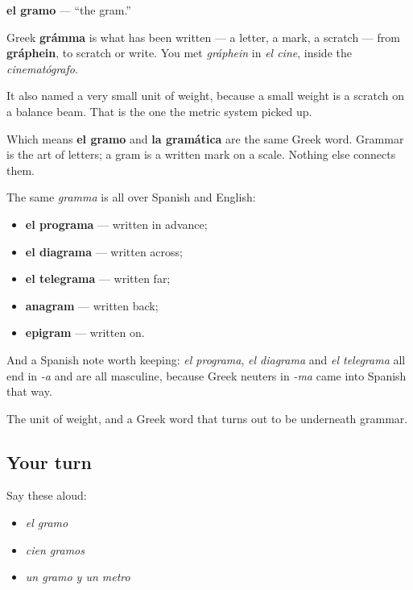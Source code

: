 \begin{cousinweb}
\textbf{el gramo} — \textquotedblleft{}the gram.\textquotedblright{}

Greek \textbf{grámma} is what has been written — a letter, a mark, a scratch — from \textbf{gráphein}, to scratch or write. You met \emph{gráphein} in \emph{el cine}, inside the \emph{cinematógrafo}.

It also named a very small unit of weight, because a small weight is a scratch on a balance beam. That is the one the metric system picked up.

Which means \textbf{el gramo} and \textbf{la gramática} are the same Greek word. Grammar is the art of letters; a gram is a written mark on a scale. Nothing else connects them.

The same \emph{gramma} is all over Spanish and English:

\begin{itemize}
\raggedright
  \item \textbf{el programa} — written in advance;
  \item \textbf{el diagrama} — written across;
  \item \textbf{el telegrama} — written far;
  \item \textbf{anagram} — written back;
  \item \textbf{epigram} — written on.
\end{itemize}

And a Spanish note worth keeping: \emph{el programa}, \emph{el diagrama} and \emph{el telegrama} all end in \emph{-a} and are all masculine, because Greek neuters in \emph{-ma} came into Spanish that way.
\end{cousinweb}

\begin{grammarlens}[title={What you've built}]
The unit of weight, and a Greek word that turns out to be underneath grammar.
\end{grammarlens}

\subsection*{Your turn}
Say these aloud:

\begin{itemize}
\raggedright
  \item \emph{el gramo}
  \item \emph{cien gramos}
  \item \emph{un gramo y un metro}
\end{itemize}

